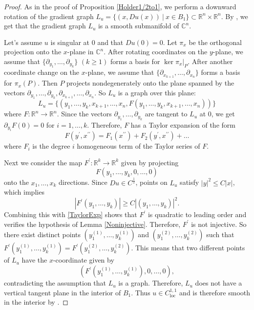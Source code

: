 \documentclass[12pt,reqno]{amsart}%
\theoremstyle{plain}
\numberwithin{equation}{section}
\theoremstyle{definition}
\theoremstyle{remark}
\newcommand{\C}{\mathbb{C}}
\newcommand{\R}{\mathbb{R}}
\begin{document}
\begin{proof} As in the proof of Proposition \ref{Holder1/2to1}, we perform a downward rotation of the gradient graph  $L_u=\{(x,Du(x)) \: |\: x\in B_1\}\subset\R^n\times \R^n$. By \cite{ChenWarren}, we get that the gradient graph $L_u$ is a smooth submanifold of $\C^n$. 


Let's assume $u$ is singular at $0$ and that $D u ( 0) =0.$ Let $\pi_x$ be the orthogonal projection onto the $x$-plane in $\C^n$. After rotating coordinates on the $y$-plane, we assume that $\{\partial_{y_1}, \dots , \partial_{y_k} \}$ $(k \geq 1)$ forms a basis for $\ker \pi_x |_P.$ After another coordinate change on the $x$-plane, we assume that $\{\partial_{x_{k+1} } , \dots , \partial_{x_n}\} $ forms a basis for $\pi_x ( P) .$ Then $P$ projects nondegenerately onto the plane spanned by the vectors $\partial_{y_1}, \dots , \partial_{y_k}, \partial_{x_{k+1} }, \dots , \partial_{x_n} $. So $L_u$ is a graph over this plane:
$$ L_u = \{ (y_1, \dots , y_k, x_{k+1 }, \dots , x_n, F ( y_1, \dots , y_k, x_{k+1 }, \dots , x_n)) \}$$
where $F : \R^n \to \R^n$. Since the vectors $\partial_{y_1}, \dots , \partial_{y_k}$ are tangent to $L_u$ at $0$, we get $\partial_{y_i} F (0) = 0 $ for $i = 1, \dots, k$. Therefore, $F$ has a Taylor expansion of the form 
\begin{equation}\label{TaylorExp}  F(y^\prime ,x^{\prime \prime }) = F_1(x^{\prime \prime }  ) + F_2(y^{\prime } ,x^{\prime \prime } ) + \dots \end{equation}
where  $F_i$ is the degree $i$ homogeneous term of the Taylor series of $F$. 



Next we consider the map $F^\prime :\R^k \to \R^k$ given by projecting \[F(y_1, \dots, y_k, 0 , \dots , 0)  \] onto the $x_1, \dots , x_k$ directions. Since $D u \in C^{\frac 12 }$, points on $L_u$ satisfy $|y|^2 \leq C | x|$, which implies \[|F^\prime ( y_1 ,\dots, y_k) | \geq C |(y_1, \dots, y_k)|^2. \] Combining this with \eqref{TaylorExp} shows that $F^\prime$ is quadratic to leading order and verifies the hypothesis of Lemma \ref{Noninjective}. Therefore, $F^\prime$ is not injective. So there exist distinct points $(y_1^{(1)} , \dots, y_{k}^{(1)})$ and 
$(y_1^{(2)} , \dots, y_{k}^{(2)})$ such that $F^\prime (y_1^{(1)} , \dots, y_{k}^{(1)})=F^\prime(y_1^{(2)} , \dots, y_{k}^{(2)}) .$ This means that two different points of $L_u$ have the $x$-coordinate given by  \[(F^\prime (y_1^{(1)} , \dots, y_{k}^{(1)}), 0, \dots, 0),\] contradicting the assumption that $L_u$ is a graph. Therefore, $L_u$ does not have a vertical tangent plane in the interior of $B_1$. Thus $ u\in C^{1,1}_{\mathrm{loc}}$ and is therefore smooth in the interior by \cite[Theorem 1.2]{ChenWarren}.
\end{proof} 
\end{document}
